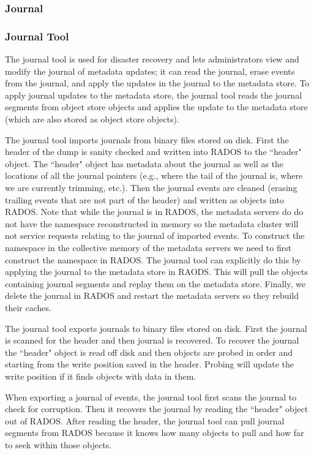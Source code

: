 \subsubsection{Journal}

\subsubsection{Journal Tool}
The journal tool is used for disaster recovery and lets administrators view and
modify the journal of metadata updates; it can read the journal, erase events
from the journal, and apply the updates in the journal to the metadata store.
To apply journal updates to the metadata store, the journal tool reads the
journal segments from object store objects and applies the update to the
metadata store (which are also stored as object store objects).  

The journal tool imports journals from binary files stored on disk.  First the
header of the dump is sanity checked and written into RADOS to the ``header"
object.  The ``header" object has metadata about the journal as well as the
locations of all the journal pointers (e.g., where the tail of the journal is,
where we are currently trimming, etc.).  Then the journal events are cleaned
(erasing trailing events that are not part of the header) and written as
objects into RADOS.  Note that while the journal is in RADOS, the metadata
servers do do not have the namespace reconstructed in memory so the metadata
cluster will not service requests relating to the journal of imported events.
To construct the namespace in the collective memory of the metadata servers we
need to first construct the namespace in RADOS. The journal tool can explicitly
do this by  applying the journal to the metadata store in RAODS. This will pull
the objects containing journal segments and replay them on the metadata store.
Finally, we delete the journal in RADOS and restart the metadata servers so
they rebuild their caches.

The journal tool exports journals to binary files stored on disk. First the
journal is scanned for the header and then journal is recovered. To recover the
journal the ``header" object is read off disk and then objects are probed in
order and starting from the write position saved in the header. Probing will
update the write position if it finds objects with data in them. 

When exporting a journal of events, the journal tool first scans the journal to
check for corruption. Then it recovers the journal by reading the ``header"
object out of RADOS.  After reading the header, the journal tool can pull
journal segments from RADOS because it knows how many objects to pull and how
far to seek within those objects.

